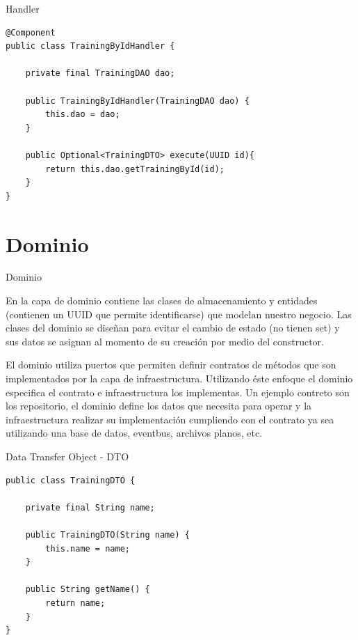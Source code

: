 \documentclass[10pt]{beamer}
\begin{document}
\begin{frame}[fragile]{Handler}

\begin{verbatim}
@Component
public class TrainingByIdHandler {

    private final TrainingDAO dao;

    public TrainingByIdHandler(TrainingDAO dao) {
        this.dao = dao;
    }

    public Optional<TrainingDTO> execute(UUID id){
        return this.dao.getTrainingById(id);
    }
}
\end{verbatim}


\end{frame}

\section{Dominio}

\begin{frame}{Dominio}

En la capa de dominio contiene las clases de almacenamiento y entidades (contienen un UUID que permite identificarse) que modelan nuestro negocio. Las clases del dominio se diseñan para evitar el cambio de estado (no tienen set) y sus datos se asignan al momento de su creación por medio del constructor.

El dominio utiliza \alert{puertos} que permiten definir contratos de métodos que son implementados por la capa de infraestructura. Utilizando éste enfoque el dominio especifica el contrato e infraestructura los implementas. Un ejemplo contreto son los repositorio, el dominio define los datos que necesita para operar y la infraestructura realizar su implementación cumpliendo con el contrato ya sea utilizando una base de datos, eventbus, archivos planos, etc.

\end{frame}



\begin{frame}[fragile]{Data Transfer Object - DTO}

\begin{verbatim}
public class TrainingDTO {

    private final String name;

    public TrainingDTO(String name) {
        this.name = name;
    }

    public String getName() {
        return name;
    }
}
\end{verbatim}

\end{frame}
\end{document}
